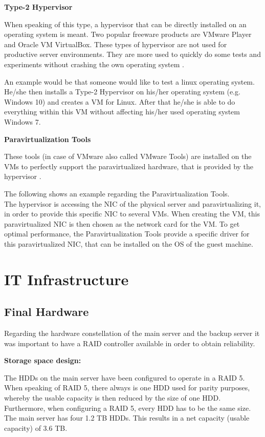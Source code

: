 \textbf{Type-2 Hypervisor}

When speaking of this type, a hypervisor that can be directly installed on an operating system is meant. Two popular freeware products are VMware Player and Oracle VM VirtualBox. These types of hypervisor are not used for productive server environments. They are more used to quickly do some tests and experiments without crashing the own operating system \cite{bill:hypervisor}. 

An example would be that someone would like to test a linux operating system. He/she then installs a Type-2 Hypervisor on his/her operating system (e.g. Windows 10) and creates a VM for Linux. After that he/she is able to do everything within this VM without affecting his/her used operating system Windows 7.

\textbf{Paravirtualization Tools}

These tools (in case of VMware also called VMware Tools) are installed on the VMs to perfectly support the paravirtualized hardware, that is provided by the hypervisor \cite{bill:hypervisor}. 

The following shows an example regarding the Paravirtualization Tools. \\
The hypervisor is accessing the \ac{NIC} of the physical server and paravirtualizing it, in order to provide this specific \ac{NIC} to several VMs. When creating the VM, this paravirtualized \ac{NIC} is then chosen as the network card for the VM. To get optimal performance, the Paravirtualization Tools provide a specific driver for this paravirtualized \ac{NIC}, that can be installed on the OS of the guest machine.

\chapter{IT Infrastructure}

\thispagestyle{standard}
\pagestyle{standard}

\section{Final Hardware}

Regarding the hardware constellation of the main server and the backup server it was important to have a \ac{RAID} controller available in order to obtain reliability. 

\textbf{Storage space design:}

The \acp{HDD} on the main server have been configured to operate in a \ac{RAID} 5. When speaking of \ac{RAID} 5, there always is one \ac{HDD} used for parity purposes, whereby the usable capacity is then reduced by the size of one \ac{HDD}. Furthermore, when configuring a \ac{RAID} 5, every \ac{HDD} has to be the same size. The main server has four 1.2 TB \acp{HDD}. This results in a net capacity (usable capacity) of 3.6 TB. 

